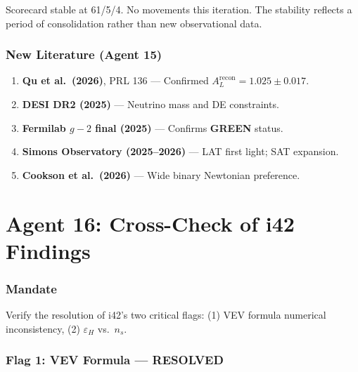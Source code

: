 \documentclass[11pt,a4paper]{article}
\newcommand{\GREEN}{\textcolor{dfdgreen}{\textbf{GREEN}}}
\newcommand{\RESOLVED}{\textcolor{dfdgreen}{\textbf{RESOLVED}}}
\begin{document}
Scorecard stable at 61/5/4. No movements this iteration. The stability reflects a period of consolidation rather than new observational data.

\section{New Literature (Agent 15)}

\begin{enumerate}
\item \textbf{Qu et al.\ (2026)}, PRL 136 --- Confirmed $A_L^{\text{recon}} = 1.025 \pm 0.017$.
\item \textbf{DESI DR2 (2025)} --- Neutrino mass and DE constraints.
\item \textbf{Fermilab $g-2$ final (2025)} --- Confirms \GREEN{} status.
\item \textbf{Simons Observatory (2025--2026)} --- LAT first light; SAT expansion.
\item \textbf{Cookson et al.\ (2026)} --- Wide binary Newtonian preference.
\end{enumerate}


\part{Agent 16: Cross-Check of i42 Findings}
\label{part:agent16}

\section{Mandate}

Verify the resolution of i42's two critical flags: (1) VEV formula numerical inconsistency, (2) $\varepsilon_H$ vs.\ $n_s$.

\section{Flag 1: VEV Formula --- \RESOLVED}
\end{document}
